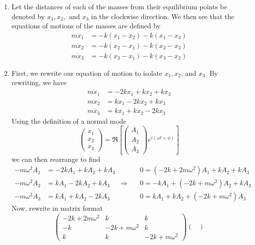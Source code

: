 \begin{sol}
\begin{enumerate}[label=\textbf{(\alph*)}] 
\item Let the distances of each of the masses from their equilibrium points be denoted by $x_1, x_2,$ and $x_3$ in the clockwise direction. We then see that the equations of motions of the masses are defined by 
\begin{align*}
    m\ddot{x}_1 &= -k (x_1 - x_2) - k (x_1 - x_3)\\
    m\ddot{x}_2 &= -k (x_2 - x_1) - k (x_2 - x_3)\\
    m\ddot{x}_3 &= -k (x_3 - x_1) - k (x_3 - x_2)
\end{align*}

\item First, we rewrite our equation of motion to isolate $x_1, x_2$, and $x_3$. By rewriting, we have 
\begin{align*}
    m\ddot{x}_1 &= -2kx_1 + kx_2 + kx_3\\
    m\ddot{x}_2 &= kx_1 - 2kx_2 + kx_3\\
    m\ddot{x}_3 &= kx_1 + kx_2 - 2kx_3
\end{align*}
Using the definition of a normal mode 
\[
\begin{pmatrix}
x_1 \\
x_2 \\
x_3
\end{pmatrix}
= 
\Re \left[
\begin{pmatrix}
A_1 \\
A_2 \\
A_3
\end{pmatrix}
e^{i (\omega t + \phi)}
\right]
\]
we can then rearrange to find 
$$\begin{aligned}- m\omega^{2}A_1 &= -2kA_1 + kA_2 + kA_3 & & 0=\left(-2k + 2m \omega^{2}\right) A_{1}+k A_{2}+k A_{3} \\
-m\omega^{2}A_2 &= kA_1 - 2kA_2 + kA_3 & \Rightarrow \quad & 0= -kA_1 + (-2k + m\omega^2)A_2 + kA_3 \\
-m\omega^2 A_3 &= kA_1 + kA_2 - 2kA_3 & & 0 = kA_1 + kA_2 + (-2k + m\omega^2)A_3
\end{aligned}$$
Now, rewrite in matrix format 
\[
\begin{pmatrix}
-2k + 2m \omega^{2} & k & k \\
-k & -2k + m\omega^2 & k \\
k & k & -2k + m\omega^2
\end{pmatrix}
\begin{pmatrix}

\end{pmatrix}\]
\end{enumerate}
\end{sol}
